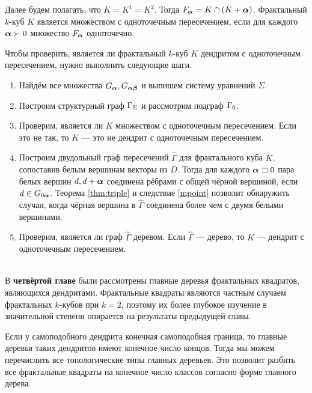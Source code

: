 Далее будем полагать, что $K=K^1=K^2$.
Тогда $F_{\bm{\alpha}}=K\cap(K+{\bm{\alpha}})$.
Фрактальный $k$-куб $K$ является множеством с одноточечным пересечением, если для каждого ${\bm{\alpha}}\succ0$ множество $F_{\bm{\alpha}}$ одноточечно.

Чтобы проверить, является ли фрактальный $k$-куб $K$ дендритом с одноточечным пересечением, нужно выполнить следующие шаги.\\

\begin{enumerate}[nolistsep]

\item Найдём все множества $G_{\bm{\alpha}}, G_{{\bm{\alpha}}{\bm{\beta}}}$ и выпишем систему уравнений $\Sigma$.

\item Построим структурный граф $\Gamma_\Sigma$ и рассмотрим подграф $\Gamma_0$.
 
\item Проверим, является ли $K$ множеством с одноточечным пересечением.
Если это не так, то $K$ --- это не дендрит с одноточечным пересечением.
    
\item Построим двудольный граф пересечений $\hat\Gamma$ для фрактального куба $K$, сопоставив белым вершинам векторы из $D$.
Тогда для каждого ${\bm{\alpha}}\sqsupset0$ пара белых вершин $d, d+{\bm{\alpha}}$ соединена рёбрами с общей чёрной вершиной, если $d\in G_{0{\bm{\alpha}}}$.
Теорема \ref{thm:triple} и следствие \ref{mpoint} позволит обнаружить случаи, когда чёрная вершина в $\hat\Gamma$ соединена более чем с двумя белыми вершинами.

\item Проверим, является ли граф $\hat\Gamma$ деревом.
Если $\hat\Gamma$ --- дерево, то $K$ --- дендрит с одноточечным пересечением.    
\end{enumerate}\quad\\



В {\bf четвёртой главе} были рассмотрены главные деревья фрактальных квадратов, являющихся дендритами.
Фрактальные квадраты являются частным случаем фрактальных $k$-кубов при $k=2$, поэтому их более глубокое изучение в значительной степени опирается на результаты предыдущей главы.

Если у самоподобного дендрита конечная самоподобная граница, то главные деревья таких дендритов имеют конечное число концов.
Тогда мы можем перечислить все топологические типы главных деревьев.
Это позволит разбить все фрактальные квадраты на конечное число классов согласно форме главного дерева.

